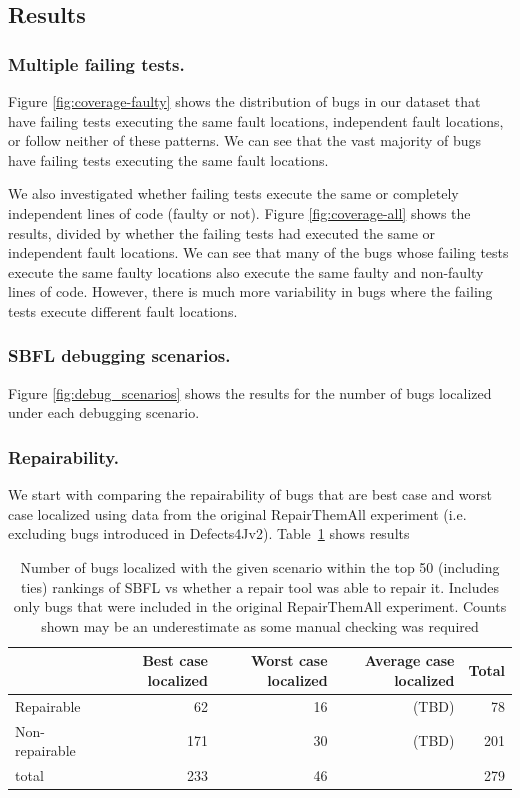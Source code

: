 \documentclass[10pt,journal,compsoc]{IEEEtran}
\begin{document}
\subsection{Results}
 \label{sec:cov_patterns}
 
 \subsubsection{Multiple failing tests.}
 Figure \ref{fig:coverage-faulty} shows the distribution of bugs in our dataset that have 
 failing tests executing the same fault locations, independent fault locations, or follow neither
 of these patterns.
 We can see that the vast majority of bugs have failing tests executing the same fault locations.

 
 We also investigated whether failing tests execute the same or completely independent lines of code (faulty or not).
 Figure \ref{fig:coverage-all} shows the results, divided by whether the failing tests had executed the same or independent fault locations.
 We can see that many of the bugs whose failing tests execute the same faulty locations also 
 execute the same faulty and non-faulty lines of code.
 However, there is much more variability in bugs where the failing tests execute different fault locations.
 
 \subsubsection{SBFL debugging scenarios.}
 Figure \ref{fig:debug_scenarios} shows the results for the number of bugs localized under each debugging scenario.
 
 
 \subsubsection{Repairability.}
 
We start with comparing the repairability of bugs that are best case and worst case localized using data from the original RepairThemAll experiment (i.e. excluding bugs introduced in Defects4Jv2). 
Table~\ref{tab:repairability} shows results 

\begin{table}
\begin{center}
\begin{tabular}{l | r r r r}
\toprule
 & Best case localized & Worst case localized & Average case localized & Total \\
\midrule
Repairable & 62  & 16  & (TBD) &	78 \\
Non-repairable & 171 & 30 & (TBD) & 201  \\
\midrule
total & 233 & 46 & & 279 \\
\bottomrule
\end{tabular}
\end{center}
\caption{\label{tab:repairability} \small Number of bugs localized with the given scenario within the top 50 (including ties) rankings of SBFL vs whether a repair tool was able to repair it. Includes only bugs that were included in the original RepairThemAll experiment. Counts shown may be an underestimate as some manual checking was required }
\end{table}
 
\end{document}
